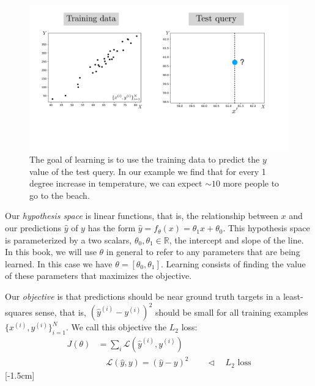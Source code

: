 \begin{figure}[h]
    \centerline{
        \includegraphics[width=0.7\linewidth]{./figures/intro_to_learning/ols_train_test.pdf}
    }
    \caption{The goal of learning is to use the training data to predict the $y$ value of the test query. In our example we find that for every 1 degree increase in temperature, we can expect $\sim 10$ more people to go to the beach.}
    \label{fig:intro_to_learning:ols_train_test}
\end{figure}

Our \emph{hypothesis space} is linear functions, that is, the relationship between $x$ and our predictions $\hat{y}$ of $y$ has the form $\hat{y} = f_{\theta}(x) = \theta_1 x + \theta_0$. This hypothesis space is parameterized by a two scalars, $\theta_0, \theta_1 \in \mathbb{R}$, the intercept and slope of the line. In this book, we will use $\theta$ in general to refer to any parameters that are being learned. In this case we have $\theta = [\theta_0, \theta_1]$. Learning consists of finding the value of these parameters that maximizes the objective.

Our \emph{objective} is that predictions should be near ground truth targets in a least-squares sense, that is, $(\hat{y}^{(i)} - y^{(i)})^2$ should be small for all training examples $\{x^{(i)}, y^{(i)}\}_{i=1}^N$. We call this objective the $L_2$ loss:
\begin{align}
    J(\theta) & = \sum_i \mathcal{L}(\hat{y}^{(i)}, y^{(i)})                                                    \\
              & \quad \mathcal{L}(\hat{y}, y) = (\hat{y} - y)^2 \quad\quad \triangleleft \quad L_2 \text{ loss}
\end{align}
[-1.5cm]%

